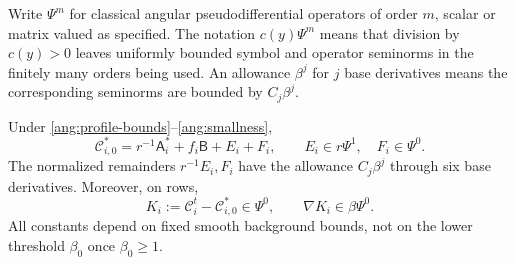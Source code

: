 Write $\Psi^m$ for classical angular pseudodifferential operators of
order $m$, scalar or matrix valued as specified.  The notation
$c(y)\Psi^m$ means that division by $c(y)>0$ leaves uniformly bounded
symbol and operator seminorms in the finitely many orders being used.
An allowance $\beta^j$ for $j$ base derivatives means the corresponding
seminorms are bounded by $C_j\beta^j$.

\begin{lemma}\label{ang:trace}
Under \eqref{ang:profile-bounds}--\eqref{ang:smallness},
\begin{equation}\label{ang:C-expansion}
 \mathcal C_{i,0}^*
 =r^{-1}\mathsf A_i^*+f_i\mathsf B+E_i+F_i,
 \qquad E_i\in r\Psi^1,\quad F_i\in\Psi^0.
\end{equation}
The normalized remainders $r^{-1}E_i,F_i$ have the allowance $C_j\beta^j$
through six base derivatives.  Moreover, on rows,
\begin{equation}\label{ang:trace-difference}
 K_i:=\mathcal C_i^t-\mathcal C_{i,0}^*
       \in\Psi^0,\qquad \nabla K_i\in\beta\Psi^0.
\end{equation}
All constants depend on fixed smooth background bounds, not on the
lower threshold $\beta_0$ once $\beta_0\ge1$.
\end{lemma}


